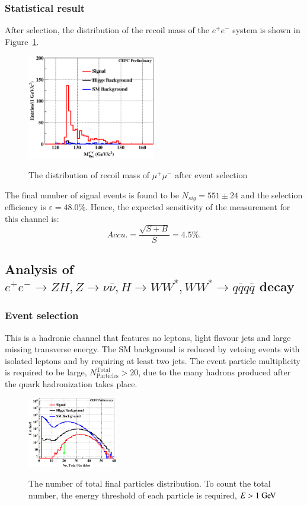 \documentclass[11pt,a4paper]{cepcnote}
\begin{document}
\subsubsection{Statistical result}
After selection, the distribution of the recoil mass of the $e^+e^-$ system is shown in Figure~\ref{fig:eehuvqqrecfit}.
\begin{figure}[H]
\centering
\includegraphics[width=0.5\textwidth]{e1e1H/uvqq/fit_RecMass}
\label{fig:eehuvqqrecfit}
\caption[]{The distribution of recoil mass of $\mu^+\mu^-$ after event selection}
\end{figure}

The final number of signal events is found to be $N_{sig} = 551\pm24$
and the selection efficiency is $\varepsilon = 48.0\%$. 
Hence, the expected sensitivity of the measurement for this channel is:
\begin{equation*}
Accu.=\frac{\sqrt{S+B}}{S} = 4.5\%.
\end{equation*}

\subsection{Analysis of $e^+e^-\rightarrow ZH, Z\rightarrow \nu\bar{\nu}, H\rightarrow WW^*, WW^*\rightarrow q\bar{q}q\bar{q}$ decay}
\subsubsection{Event selection}
This is a hadronic channel that features no leptons, light flavour jets
and large missing transverse energy. The SM background is
reduced by vetoing events with isolated leptons and by requiring at
least two jets. The event particle multiplicity is required to be large,
$N_{\mathrm{Particles}}^{\mathrm{Total}} > 20$, due to the many hadrons produced
after the quark hadronization takes place.
\begin{figure}[H]
	\centering
	\includegraphics[width= 0.35\textwidth]{nnH/fourq/TotPart}
	\label{fig:nnH4qTotPart}
	\caption[]{The number of total final particles distribution. To count the total number, the energy threshold of each particle 
	is required, $E > 1\gev$}
\end{figure}
\end{document}
